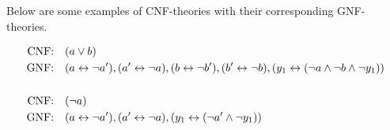 Below are some examples of CNF-theories with their corresponding GNF-theories.\\

\begin{example}
  \begin{align}
    \text{CNF:\quad}& ( a \vee b )\\
    \text{GNF:\quad}& ( a \leftrightarrow \neg a'), (a' \leftrightarrow \neg a), (b \leftrightarrow \neg b'), (b' \leftrightarrow \neg b), (y_1 \leftrightarrow (\neg a \wedge \neg b \wedge \neg y_1))\\
    \\
    \text{CNF:\quad}& (\neg a)\\
    \text{GNF:\quad}& ( a \leftrightarrow \neg a'), (a' \leftrightarrow \neg a), (y_1 \leftrightarrow (\neg a' \wedge \neg y_1))\\
  \end{align}
\end{example}
